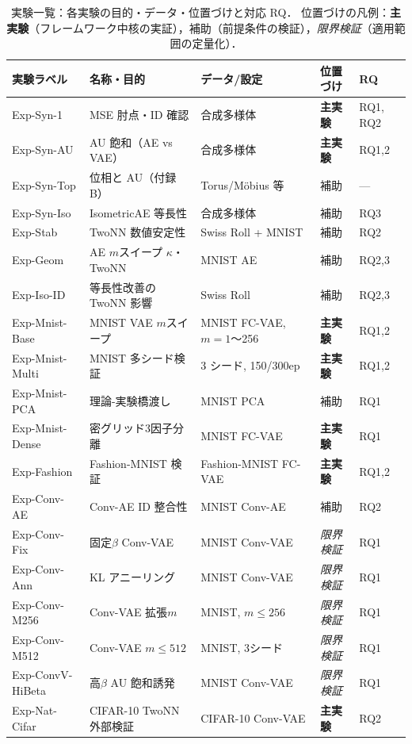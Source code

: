 \documentclass[11pt,a4paper]{jsarticle}
\begin{document}
\begin{table}[H]
\centering
\caption{実験一覧：各実験の目的・データ・位置づけと対応 RQ．
位置づけの凡例：\textbf{主実験}（フレームワーク中核の実証），補助（前提条件の検証），\textit{限界検証}（適用範囲の定量化）．}
\label{tab:exp_list}
\small
\begin{tabular}{p{3.5cm}p{4.5cm}p{3.5cm}p{2.0cm}p{1.5cm}}
\toprule
実験ラベル & 名称・目的 & データ/設定 & 位置づけ & RQ \\
\midrule
Exp-Syn-1 & MSE 肘点・ID 確認 & 合成多様体 & \textbf{主実験} & RQ1, RQ2 \\
Exp-Syn-AU & AU 飽和（AE vs VAE） & 合成多様体 & \textbf{主実験} & RQ1,2 \\
Exp-Syn-Top & 位相と AU（付録 B） & Torus/Möbius 等 & 補助 & --- \\
Exp-Syn-Iso & IsometricAE 等長性 & 合成多様体 & 補助 & RQ3 \\
Exp-Stab & TwoNN 数値安定性 & Swiss Roll + MNIST & 補助 & RQ2 \\
Exp-Geom & AE $m$スイープ $\kappa$・TwoNN & MNIST AE & 補助 & RQ2,3 \\
Exp-Iso-ID & 等長性改善の TwoNN 影響 & Swiss Roll & 補助 & RQ2,3 \\
Exp-Mnist-Base & MNIST VAE $m$スイープ & MNIST FC-VAE, $m=1$〜256 & \textbf{主実験} & RQ1,2 \\
Exp-Mnist-Multi & MNIST 多シード検証 & 3 シード, 150/300ep & \textbf{主実験} & RQ1,2 \\
Exp-Mnist-PCA & 理論-実験橋渡し & MNIST PCA & 補助 & RQ1 \\
Exp-Mnist-Dense & 密グリッド3因子分離 & MNIST FC-VAE & \textbf{主実験} & RQ1 \\
Exp-Fashion & Fashion-MNIST 検証 & Fashion-MNIST FC-VAE & \textbf{主実験} & RQ1,2 \\
Exp-Conv-AE & Conv-AE ID 整合性 & MNIST Conv-AE & 補助 & RQ2 \\
Exp-Conv-Fix & 固定$\beta$ Conv-VAE & MNIST Conv-VAE & \textit{限界検証} & RQ1 \\
Exp-Conv-Ann & KL アニーリング & MNIST Conv-VAE & \textit{限界検証} & RQ1 \\
Exp-Conv-M256 & Conv-VAE 拡張$m$ & MNIST, $m\leq256$ & \textit{限界検証} & RQ1 \\
Exp-Conv-M512 & Conv-VAE $m\leq512$ & MNIST, 3シード & \textit{限界検証} & RQ1 \\
Exp-ConvV-HiBeta & 高$\beta$ AU 飽和誘発 & MNIST Conv-VAE & \textit{限界検証} & RQ1 \\
Exp-Nat-Cifar & CIFAR-10 TwoNN 外部検証 & CIFAR-10 Conv-VAE & \textbf{主実験} & RQ2 \\

\end{tabular}
\end{table}
\end{document}
